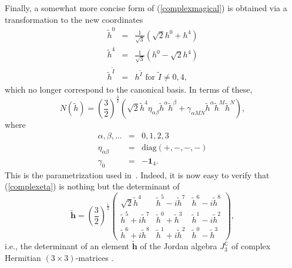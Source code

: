 \documentclass[a4paper,11pt]{article}
\newcommand{\ti}{\ensuremath{\tilde{I}}}
\begin{document}
\begin{appendix}
Finally, a  somewhat more concise form of (\ref{complexmagical})
is obtained via  a transformation to the new coordinates 
\begin{eqnarray}
{\tilde{h}}^{0}&=&\frac{1}{\sqrt{3}}(\sqrt{2}h^{0}+h^{4})\nonumber\\
{\tilde{h}}^{4}&=&\frac{1}{\sqrt{3}}(h^{0}-\sqrt{2}h^{4})\nonumber\\
{\tilde{h}}^{\ti}&=&h^{\ti} \textrm{ for } \ti\neq 0,4,\nonumber
\end{eqnarray}
which no longer
correspond to the canonical basis. In terms of these,
\begin{equation}\label{complexeta}
N(\tilde{h})=\left(\frac{3}{2}\right)^{\frac{3}{2}}\left(\sqrt{2}{\tilde{h}}^{4}
\eta_{\alpha\beta}{\tilde{h}}^{
\alpha}{\tilde{h}}^{\beta}+\gamma_{\alpha
MN}{\tilde{h}}^{\alpha}{\tilde{h}}^{M}{\tilde{h}}^{N}\right),
\end{equation}
where
\begin{eqnarray}
\alpha, \beta,\ldots &=& 0,1,2,3\nonumber\\
\eta_{\alpha \beta}&=&\textrm{diag}(+,-,-,-)\nonumber\\
\gamma_{0}&=&-\mathbf{1}_{4}\nonumber.
\end{eqnarray}
This is the parametrization used in~\cite{GST1}. Indeed, it is now
easy to verify that (\ref{complexeta}) is nothing but the
determinant of
\begin{displaymath}
\tilde{\mathbf{h}}=\left(\frac{3}{2}\right)^{\frac{1}{2}}\left(
\begin{array}{ccc}
\sqrt{2}{\tilde{h}}^{4}&{\tilde{h}}^{5}-i{\tilde{h}}^{7}&
{\tilde{h}}^{6}-i
{\tilde{h}}^{8}\\
{\tilde{h}}^{5}+i{\tilde{h}}^{7}&{\tilde{h}}^{0}+{\tilde{h}}^{3}&
{\tilde{h}}^{1}-i{\tilde{h}}^{2}\\
{\tilde{h}}^{6}+i{\tilde{h}}^{8}&{\tilde{h}}^{1}+i{\tilde{h}}^{2}&
{\tilde{h}}^{0}-{\tilde{h}}^{3}
\end{array}\right),
\end{displaymath}
i.e., the determinant of an  element $\tilde{\mathbf{h}}$ of the Jordan
algebra $J_{3}^{\mathbb{C}}$ of complex Hermitian $(3\times
3)$-matrices \cite{GST1}.

\end{appendix}
\end{document}
